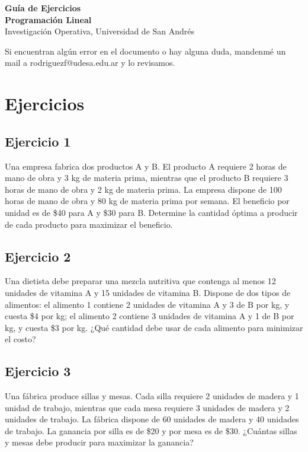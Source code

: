 \documentclass[12pt]{article}
\begin{document}
\begin{center}
    {\LARGE \textbf{Guía de Ejercicios \\Programación Lineal}}\\[0.5em]
    {Investigación Operativa, Universidad de San Andrés}
\end{center}

Si encuentran algún error en el documento o hay alguna duda, mandenmé un mail a rodriguezf@udesa.edu.ar y lo revisamos.

\section{Ejercicios}

\subsection{Ejercicio 1}

Una empresa fabrica dos productos A y B. El producto A requiere 2 horas de mano de obra y 3 kg de materia prima, mientras que el producto B requiere 3 horas de mano de obra y 2 kg de materia prima. La empresa dispone de 100 horas de mano de obra y 80 kg de materia prima por semana. El beneficio por unidad es de \$40 para A y \$30 para B. Determine la cantidad óptima a producir de cada producto para maximizar el beneficio.

\subsection{Ejercicio 2}

Una dietista debe preparar una mezcla nutritiva que contenga al menos 12 unidades de vitamina A y 15 unidades de vitamina B. Dispone de dos tipos de alimentos: el alimento 1 contiene 2 unidades de vitamina A y 3 de B por kg, y cuesta \$4 por kg; el alimento 2 contiene 3 unidades de vitamina A y 1 de B por kg, y cuesta \$3 por kg. ¿Qué cantidad debe usar de cada alimento para minimizar el costo?

\subsection{Ejercicio 3}

Una fábrica produce sillas y mesas. Cada silla requiere 2 unidades de madera y 1 unidad de trabajo, mientras que cada mesa requiere 3 unidades de madera y 2 unidades de trabajo. La fábrica dispone de 60 unidades de madera y 40 unidades de trabajo. La ganancia por silla es de \$20 y por mesa es de \$30. ¿Cuántas sillas y mesas debe producir para maximizar la ganancia?
\end{document}
